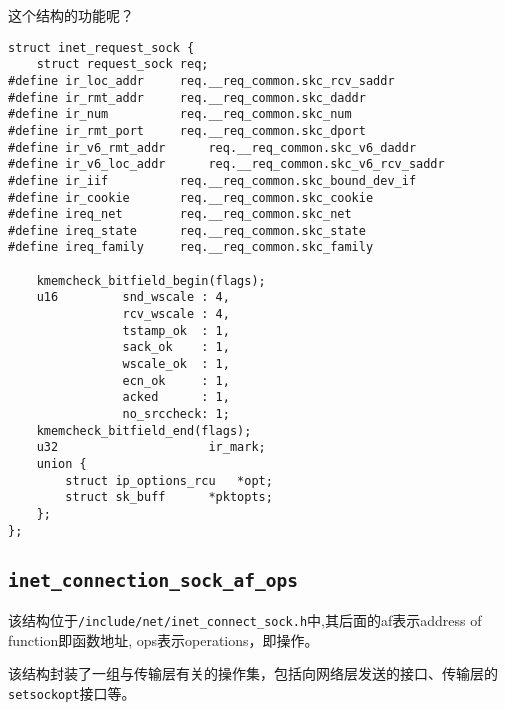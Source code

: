         这个结构的功能呢？

\begin{verbatim}
struct inet_request_sock {
    struct request_sock req;
#define ir_loc_addr     req.__req_common.skc_rcv_saddr
#define ir_rmt_addr     req.__req_common.skc_daddr
#define ir_num          req.__req_common.skc_num
#define ir_rmt_port     req.__req_common.skc_dport
#define ir_v6_rmt_addr      req.__req_common.skc_v6_daddr
#define ir_v6_loc_addr      req.__req_common.skc_v6_rcv_saddr
#define ir_iif          req.__req_common.skc_bound_dev_if
#define ir_cookie       req.__req_common.skc_cookie
#define ireq_net        req.__req_common.skc_net
#define ireq_state      req.__req_common.skc_state
#define ireq_family     req.__req_common.skc_family

    kmemcheck_bitfield_begin(flags);
    u16         snd_wscale : 4,
                rcv_wscale : 4,
                tstamp_ok  : 1,
                sack_ok    : 1,
                wscale_ok  : 1,
                ecn_ok     : 1,
                acked      : 1,
                no_srccheck: 1;
    kmemcheck_bitfield_end(flags);
    u32                     ir_mark;
    union {
        struct ip_options_rcu   *opt;
        struct sk_buff      *pktopts;
    };
};
\end{verbatim}     
        \subsection{\texttt{inet_connection_sock_af_ops}}

            该结构位于\texttt{/include/net/inet_connect_sock.h}中,其后面的af表示address of function即函数地址, ops表示operations，即操作。

            该结构封装了一组与传输层有关的操作集，包括向网络层发送的接口、传输层的\texttt{setsockopt}接口等。

